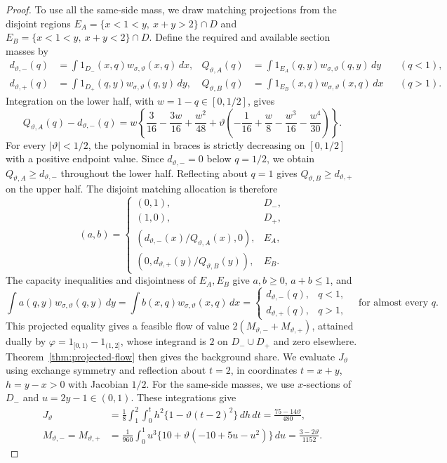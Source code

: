 \begin{proof}
To use all the same-side mass, we draw matching projections from the disjoint regions
\(E_A=\{x<1<y,\ x+y>2\}\cap D\) and
\(E_B=\{x<1<y,\ x+y<2\}\cap D\). Define the required and available section masses by
\[
\begin{aligned}
d_{\vartheta,-}(q)&=\int 1_{D_-}(x,q)w_{\sigma,\vartheta}(x,q)\,dx,&
Q_{\vartheta,A}(q)&=\int1_{E_A}(q,y)w_{\sigma,\vartheta}(q,y)\,dy
&& (q<1),\\
d_{\vartheta,+}(q)&=\int1_{D_+}(q,y)w_{\sigma,\vartheta}(q,y)\,dy,&
Q_{\vartheta,B}(q)&=\int1_{E_B}(x,q)w_{\sigma,\vartheta}(x,q)\,dx
&& (q>1).
\end{aligned}
\]
Integration on the lower half, with \(w=1-q\in[0,1/2]\), gives
\[
Q_{\vartheta,A}(q)-d_{\vartheta,-}(q)
=w\left\{\frac3{16}-\frac{3w}{16}+\frac{w^2}{48}
+\vartheta\left(-\frac1{16}+\frac{w}{8}
-\frac{w^3}{16}-\frac{w^4}{30}\right)\right\}.
\]
For every \(|\vartheta|<1/2\), the polynomial in braces is strictly decreasing on \([0,1/2]\) with a positive endpoint value. Since \(d_{\vartheta,-}=0\) below \(q=1/2\), we obtain \(Q_{\vartheta,A}\ge d_{\vartheta,-}\) throughout the lower half. Reflecting about \(q=1\) gives \(Q_{\vartheta,B}\ge d_{\vartheta,+}\) on the upper half. The disjoint matching allocation is therefore
\begin{equation}
(a,b)=
\begin{cases}
(0,1),&D_-,\\
(1,0),&D_+,\\
(d_{\vartheta,-}(x)/Q_{\vartheta,A}(x),0),&E_A,\\
(0,d_{\vartheta,+}(y)/Q_{\vartheta,B}(y)),&E_B.
\end{cases}\tag{B.2}\label{eq:B.2}
\end{equation}
The capacity inequalities and disjointness of \(E_A,E_B\) give \(a,b\ge0\), \(a+b\le1\), and
\begin{equation}
\int a(q,y)w_{\sigma,\vartheta}(q,y)\,dy
=\int b(x,q)w_{\sigma,\vartheta}(x,q)\,dx
=
\begin{cases}
d_{\vartheta,-}(q),&q<1,\\
d_{\vartheta,+}(q),&q>1,
\end{cases}
\quad\text{for almost every }q.
\tag{B.3}\label{eq:B.3}
\end{equation}
This projected equality gives a feasible flow of value \(2(M_{\vartheta,-}+M_{\vartheta,+})\), attained dually by \(\varphi=1_{[0,1)}-1_{(1,2]}\), whose integrand is \(2\) on \(D_-\cup D_+\) and zero elsewhere. Theorem~\ref{thm:projected-flow} then gives the background share. We evaluate \(J_\vartheta\) using exchange symmetry and reflection about \(t=2\), in coordinates \(t=x+y\), \(h=y-x>0\) with Jacobian \(1/2\). For the same-side masses, we use \(x\)-sections of \(D_-\) and \(u=2y-1\in(0,1)\). These integrations give
\[
\begin{aligned}
J_\vartheta
&=\frac18\int_1^2\int_0^t
h^2\{1-\vartheta(t-2)^2\}\,dh\,dt
=\frac{75-14\vartheta}{480},\\
M_{\vartheta,-}=M_{\vartheta,+}
&=\frac1{960}\int_0^1
u^3\{10+\vartheta(-10+5u-u^2)\}\,du
=\frac{3-2\vartheta}{1152}.
\end{aligned}
\]
\end{proof}

